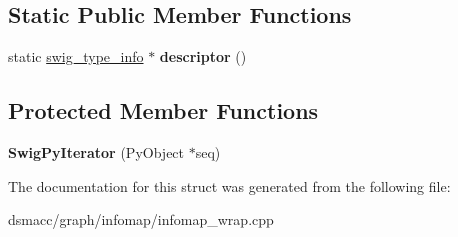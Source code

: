 \subsection*{Static Public Member Functions}
\begin{DoxyCompactItemize}
\item 
\mbox{\label{structswig_1_1SwigPyIterator_ac77f47f6ed06f7113252940588a3f39e}} 
static \mbox{\hyperlink{structswig__type__info}{swig\+\_\+type\+\_\+info}} $\ast$ {\bfseries descriptor} ()
\end{DoxyCompactItemize}
\subsection*{Protected Member Functions}
\begin{DoxyCompactItemize}
\item 
\mbox{\label{structswig_1_1SwigPyIterator_a88c0a14160ab680c8251f61e01b38d77}} 
{\bfseries Swig\+Py\+Iterator} (Py\+Object $\ast$seq)
\end{DoxyCompactItemize}


The documentation for this struct was generated from the following file\+:\begin{DoxyCompactItemize}
\item 
dsmacc/graph/infomap/infomap\+\_\+wrap.\+cpp\end{DoxyCompactItemize}
